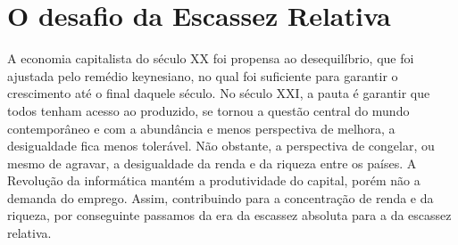 \section{O desafio da Escassez Relativa}

A economia capitalista do século XX foi propensa ao desequilíbrio, que foi ajustada pelo remédio keynesiano, no qual foi suficiente para garantir o crescimento até o final daquele século.
No século XXI, a pauta é garantir que todos tenham acesso ao produzido, se tornou a questão central do mundo contemporâneo e com a abundância e menos perspectiva de melhora, a desigualdade fica menos tolerável.
Não obstante, a perspectiva de congelar, ou mesmo de agravar, a desigualdade da renda e da riqueza entre os países.
A Revolução da informática mantém a produtividade do capital, porém não a demanda do emprego.
Assim, contribuindo para a concentração de renda e da riqueza, por conseguinte passamos da era da escassez absoluta para a da escassez relativa.
